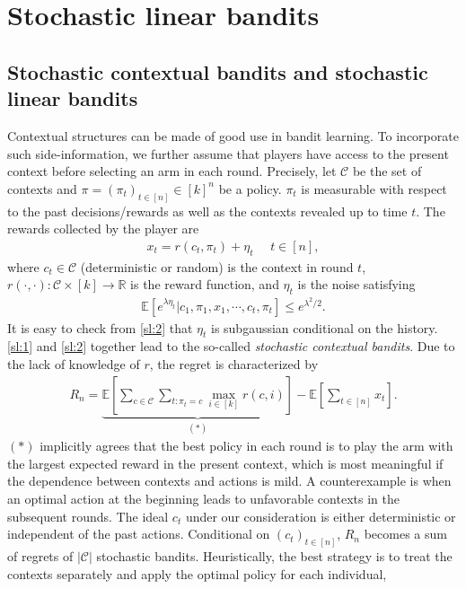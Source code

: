\documentclass[10pt,a4article]{amsart}
\numberwithin{equation}{section}
\theoremstyle{plain}
\theoremstyle{definition}
\def\R{{\mathbb R}}
\def\E{{\mathbb E}}
\def\R{{\mathbb R}}
\begin{document}
\section{Stochastic linear bandits}

\subsection{Stochastic contextual bandits and stochastic linear bandits}

Contextual structures can be made of good use in bandit learning. To incorporate such side-information, we further assume that players have access to the present context before selecting an arm in each round. Precisely, let $\mathcal C$ be the set of contexts and $\pi=(\pi_t)_{t\in [n]}\in [k]^n$ be a policy. $\pi_t$ is measurable with respect to the past decisions/rewards as well as the contexts revealed up to time $t$. The rewards collected by the player are 
\begin{align}
x_{t} = r(c_t, \pi_t)+\eta_{t}\ \ \ \ \ \ t\in [n],\label{sl:1}
\end{align}
where $c_t\in\mathcal C$ (deterministic or random) is the context in round $t$, $r(\cdot, \cdot):\mathcal C\times [k]\to\R$ is the reward function, and $\eta_{t}$ is the noise satisfying 
\begin{align}
\E[e^{\lambda\eta_{t}}|c_{1}, \pi_{1}, x_{1}, \cdots, c_{t}, \pi_{t}]\leq e^{\lambda^2/2}. \label{sl:2}
\end{align}
It is easy to check from \eqref{sl:2} that $\eta_t$ is subgaussian conditional on the history. \eqref{sl:1} and \eqref{sl:2} together lead to the so-called \emph{stochastic contextual bandits}. Due to the lack of knowledge of $r$, the regret is characterized by 
\begin{align}
R_n = \underbrace{\E\left[\sum_{c\in\mathcal C}\sum_{t: \pi_t = c}\max_{i\in [k]}r(c, i)\right]}_{(*)} - \E\left[\sum_{t\in [n]}x_{t}\right]. \label{sl:reg}
\end{align}
$(*)$ implicitly agrees that the best policy in each round is to play the arm with the largest expected reward in the present context, which is most meaningful if the dependence between contexts and actions is mild. A counterexample is when an optimal action at the beginning leads to unfavorable contexts in the subsequent rounds. The ideal $c_t$ under our consideration is either deterministic or independent of the past actions.  Conditional on $(c_t)_{t\in [n]}$, $R_n$ becomes a sum of regrets of $|\mathcal C|$ stochastic bandits. Heuristically, the best strategy is to treat the contexts separately and apply the optimal policy for each individual,  
\end{document}
